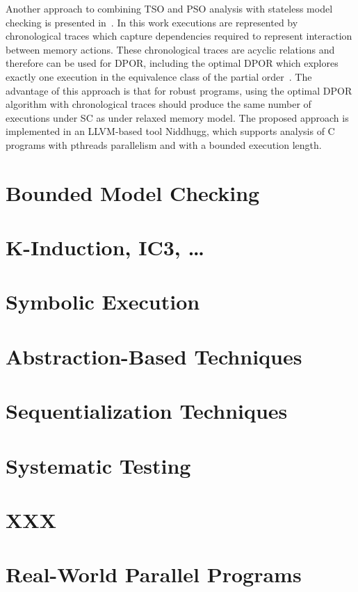 Another approach to combining TSO and PSO analysis with stateless model
checking is presented in~\cite{Abdulla2015}. In this work executions are
represented by chronological traces which capture dependencies required
to represent interaction between memory actions. These chronological
traces are acyclic relations and therefore can be used for DPOR,
including the optimal DPOR which explores exactly one execution in the
equivalence class of the partial order~\cite{Abdulla2014}. The advantage
of this approach is that for robust programs, using the optimal DPOR
algorithm with chronological traces should produce the same number of
executions under SC as under relaxed memory model. The proposed approach
is implemented in an LLVM-based tool Niddhugg, which supports analysis
of C programs with pthreads parallelism and with a bounded execution
length.

\section{Bounded Model Checking}

\section{K-Induction, IC3, …}

\section{Symbolic Execution}

\section{Abstraction-Based Techniques}

\section{Sequentialization Techniques}

\section{Systematic Testing}

\section{XXX}

\section{Real-World Parallel Programs}


